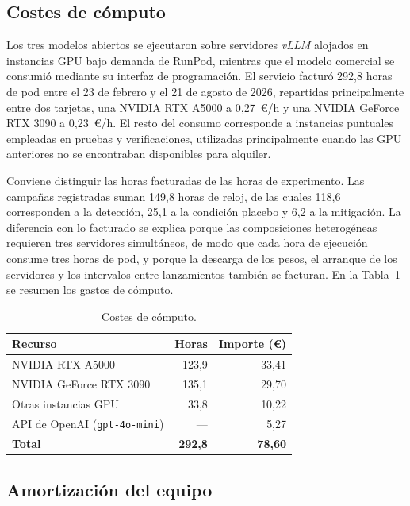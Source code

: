 \subsection{Costes de cómputo}

Los tres modelos abiertos se ejecutaron sobre servidores \textit{vLLM} alojados en instancias GPU bajo demanda de RunPod, mientras que el modelo comercial se consumió mediante su interfaz de programación. El servicio facturó 292,8 horas de pod entre el 23 de febrero y el 21 de agosto de 2026, repartidas principalmente entre dos tarjetas, una NVIDIA RTX A5000 a 0,27~\euro/h y una NVIDIA GeForce RTX 3090 a 0,23~\euro/h. El resto del consumo corresponde a instancias puntuales empleadas en pruebas y verificaciones, utilizadas principalmente cuando las GPU anteriores no se
encontraban disponibles para alquiler.

Conviene distinguir las horas facturadas de las horas de experimento. Las campañas registradas suman 149,8 horas de reloj, de las cuales 118,6 corresponden a la detección, 25,1 a la condición placebo y 6,2 a la mitigación. La diferencia con lo facturado se explica porque las composiciones heterogéneas requieren tres servidores simultáneos, de modo que cada hora de ejecución consume tres horas de pod, y porque la descarga de los pesos, el arranque de los servidores y los intervalos entre lanzamientos también se facturan. En la Tabla~\ref{tab:presupuesto_computo} se resumen los gastos de cómputo.

\begin{table}[htbp]
	\centering
	\caption{Costes de cómputo.}
	\label{tab:presupuesto_computo}
	\small
	\begin{tabular}{p{5.5cm} r r}
		\hline
		\textbf{Recurso} & \textbf{Horas} & \textbf{Importe (\euro)} \\
		\hline
		NVIDIA RTX A5000 & 123,9 & 33,41 \\
		NVIDIA GeForce RTX 3090 & 135,1 & 29,70 \\
		Otras instancias GPU & 33,8 & 10,22 \\
		API de OpenAI (\texttt{gpt-4o-mini}) & --- & 5,27 \\
		\hline
		\textbf{Total} & \textbf{292,8} & \textbf{78,60} \\
		\hline
	\end{tabular}
\end{table}

\subsection{Amortización del equipo}

